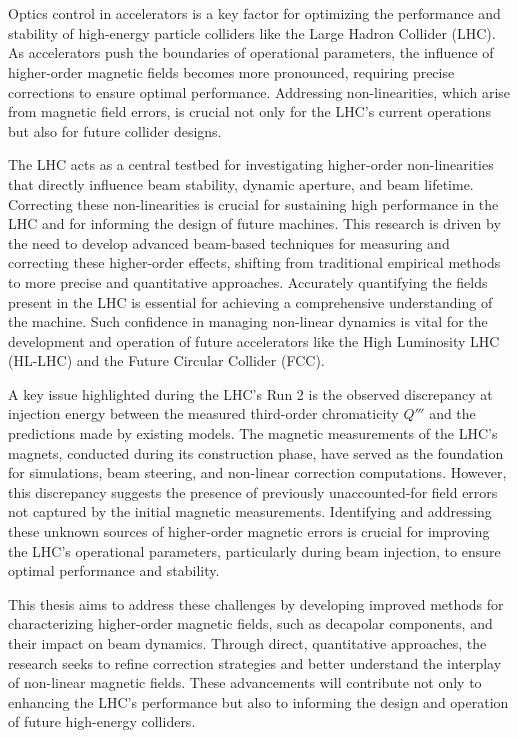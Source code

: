 \section{} 


Optics control in accelerators is a key factor for optimizing the performance and stability
of high-energy particle colliders like the Large Hadron Collider (LHC). As accelerators push the
boundaries of operational parameters, the influence of higher-order magnetic fields becomes more
pronounced, requiring precise corrections to ensure optimal performance. Addressing non-linearities,
which arise from magnetic field errors, is crucial not only for the LHC's current operations but
also for future collider designs.


The LHC acts as a central testbed for investigating higher-order non-linearities that directly
influence beam stability, dynamic aperture, and beam lifetime. Correcting these non-linearities is
crucial for sustaining high performance in the LHC and for informing the design of future machines.
This research is driven by the need to develop advanced beam-based techniques for measuring and
correcting these higher-order effects, shifting from traditional empirical methods to more precise
and quantitative approaches. Accurately quantifying the fields present in the LHC is essential for
achieving a comprehensive understanding of the machine. Such confidence in managing non-linear
dynamics is vital for the development and operation of future accelerators like the High Luminosity
LHC (HL-LHC) and the Future Circular Collider (FCC).


A key issue highlighted during the LHC's Run 2 is the observed discrepancy at injection energy
between the measured third-order chromaticity $Q'''$ and the predictions made by existing models.
The magnetic measurements of the LHC's magnets, conducted during its construction phase, have served
as the foundation for simulations, beam steering, and non-linear correction computations.  However,
this discrepancy suggests the presence of previously unaccounted-for field errors not captured by
the initial magnetic measurements. Identifying and addressing these unknown sources of higher-order
magnetic errors is crucial for improving the LHC's operational parameters, particularly during beam
injection, to ensure optimal performance and stability.


This thesis aims to address these challenges by developing improved methods for characterizing
higher-order magnetic fields, such as decapolar components, and their impact on beam dynamics.
Through direct, quantitative approaches, the research seeks to refine correction strategies and
better understand the interplay of non-linear magnetic fields. These advancements will contribute
not only to enhancing the LHC's performance but also to informing the design and operation of future
high-energy colliders.